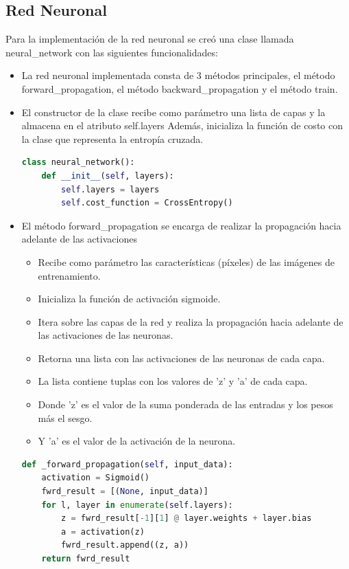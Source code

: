 \documentclass{article}
\begin{document}
    \subsection{Red Neuronal}\label{subsec:red-neuronal}
    Para la implementación de la red neuronal se creó una clase llamada neural\_network con las siguientes funcionalidades:
    \begin{itemize}
        \item La red neuronal implementada consta de 3 métodos principales, el método forward\_propagation, el método backward\_propagation y el método train.

        \item El constructor de la clase recibe como parámetro una lista de capas y la almacena en el atributo self.layers
        Además, inicializa la función de costo con la clase que representa la entropía cruzada.
        \begin{lstlisting}[language=Python, caption={Constructor de la red neuronal}, label={lst:neural_network_constructor}]
class neural_network():
    def __init__(self, layers):
        self.layers = layers
        self.cost_function = CrossEntropy()
        \end{lstlisting}

        \item El método forward\_propagation se encarga de realizar la propagación hacia adelante de las activaciones
        \begin{itemize}
            \item Recibe como parámetro las características (píxeles) de las imágenes de entrenamiento.
            \item Inicializa la función de activación sigmoide.
            \item Itera sobre las capas de la red y realiza la propagación hacia adelante de las activaciones de las neuronas.
            \item Retorna una lista con las activaciones de las neuronas de cada capa.
            \item La lista contiene tuplas con los valores de 'z' y 'a' de cada capa.
            \item Donde 'z' es el valor de la suma ponderada de las entradas y los pesos más el sesgo.
            \item Y 'a' es el valor de la activación de la neurona.
        \end{itemize}
        \begin{lstlisting}[language=Python, caption={Propagación hacia adelante}, label={lst:forward_propagation}]
def _forward_propagation(self, input_data):
    activation = Sigmoid()
    fwrd_result = [(None, input_data)]
    for l, layer in enumerate(self.layers):
        z = fwrd_result[-1][1] @ layer.weights + layer.bias
        a = activation(z)
        fwrd_result.append((z, a))
    return fwrd_result
        \end{lstlisting}


\end{itemize}
\end{document}
